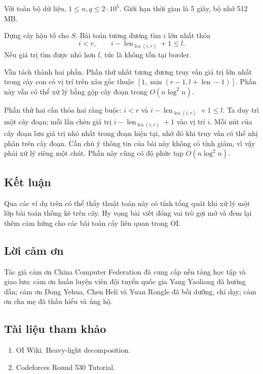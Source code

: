 \documentclass[11pt]{article}
\begin{document}
Với toàn bộ dữ liệu, \(1\le n,q\le 2\cdot 10^5\). Giới hạn thời gian là
5 giây, bộ nhớ 512 MB.

Dựng cây hậu tố cho \(S\). Bài toán tương đương tìm \(i\) lớn nhất thỏa
\[
  i<r,\qquad i-\operatorname{len}_{\operatorname{lca}(i,r)}+1\le l.
\]
Nếu giá trị tìm được nhỏ hơn \(l\), tức là không tồn tại border.

Vẫn tách thành hai phần. Phần thứ nhất tương đương truy vấn giá trị lớn nhất
trong cây con có vị trí trên xâu gốc thuộc
\([1,\min(r-1,l+\operatorname{len}-1)]\). Phần này vẫn có thể xử lý bằng gộp
cây đoạn trong \(O(n\log^2 n)\).

Phần thứ hai cần thỏa hai ràng buộc: \(i<r\) và
\(i-\operatorname{len}_{\operatorname{lca}(i,r)}+1\le l\). Ta duy trì một cây
đoạn; mỗi lần chèn giá trị
\(i-\operatorname{len}_{\operatorname{lca}(i,r)}+1\) vào vị trí \(i\). Mỗi nút
của cây đoạn lưu giá trị nhỏ nhất trong đoạn hiện tại, nhờ đó khi truy vấn có
thể nhị phân trên cây đoạn. Cần chú ý thông tin của bài này không có tính giảm,
vì vậy phải xử lý riêng một chút. Phần này cũng có độ phức tạp
\(O(n\log^2 n)\).

\subsection{Kết luận}

Qua các ví dụ trên có thể thấy thuật toán này có tính tổng quát khi xử lý một
lớp bài toán thống kê trên cây. Hy vọng bài viết đóng vai trò gợi mở và đem
lại thêm cảm hứng cho các bài toán cây liên quan trong OI.

\subsection{Lời cảm ơn}

Tác giả cảm ơn China Computer Federation đã cung cấp nền tảng học tập và giao
lưu; cảm ơn huấn luyện viên đội tuyển quốc gia Yang Yaoliang đã hướng dẫn; cảm
ơn Dong Yehua, Chen Heli và Yuan Rongle đã bồi dưỡng, chỉ dạy; cảm ơn cha mẹ
đã thấu hiểu và ủng hộ.

\subsection{Tài liệu tham khảo}

\begin{enumerate}
  \item OI Wiki. Heavy-light decomposition.
  \item Codeforces Round 530 Tutorial.
\end{enumerate}
\end{document}
